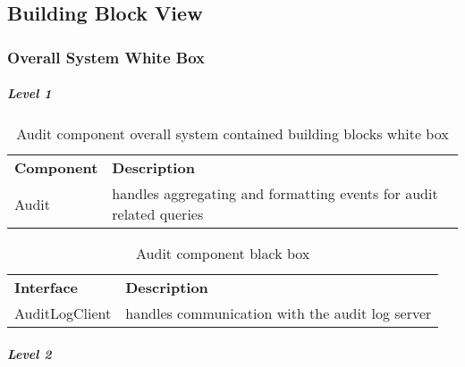 \subsection{Building Block View}

\subsubsection{Overall System White Box}


\subparagraph{Level 1}


\begin{table}[H]
  \begin{center}
    \caption{Audit component overall system contained building blocks white box}
    \label{tab:acoscbbwb}
    \def\arraystretch{1.5}
    \begin{tabularx}{\linewidth}{|l X |}
      \hline
      \rowcolor{gray!20}
      \textbf{Component} & \textbf{Description}\\
      Audit & handles aggregating and formatting events for audit related queries\\
      \hline
    \end{tabularx}
  \end{center}
\end{table}


\begin{table}[H]
  \begin{center}
    \caption{Audit component black box}
    \label{tab:acbb}
    \def\arraystretch{1.5}
    \begin{tabularx}{\linewidth}{|l X |}
      \hline
      \rowcolor{gray!20}
      \textbf{Interface} & \textbf{Description}\\
      AuditLogClient & handles communication with the audit log server\\
      \hline
    \end{tabularx}
  \end{center}
\end{table}

\subparagraph{Level 2}



